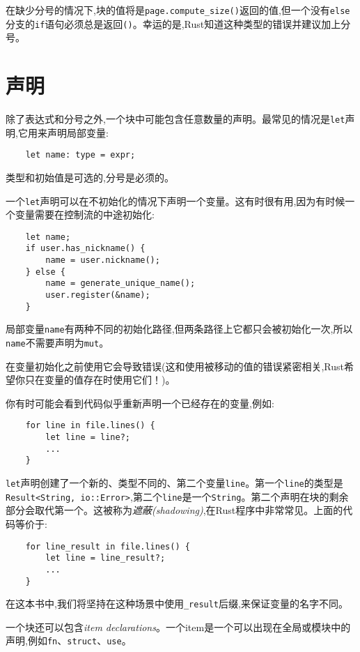 在缺少分号的情况下,块的值将是\texttt{page.compute\_size()}返回的值,但一个没有\texttt{else}分支的\texttt{if}语句必须总是返回\texttt{()}。幸运的是,Rust知道这种类型的错误并建议加上分号。

\section{声明}\label{declaration}

除了表达式和分号之外,一个块中可能包含任意数量的声明。最常见的情况是\texttt{let}声明,它用来声明局部变量:
\begin{verbatim}
    let name: type = expr;
\end{verbatim}

类型和初始值是可选的,分号是必须的。

一个\texttt{let}声明可以在不初始化的情况下声明一个变量。这有时很有用,因为有时候一个变量需要在控制流的中途初始化:
\begin{verbatim}
    let name;
    if user.has_nickname() {
        name = user.nickname();
    } else {
        name = generate_unique_name();
        user.register(&name);
    }
\end{verbatim}

局部变量\texttt{name}有两种不同的初始化路径,但两条路径上它都只会被初始化一次,所以\texttt{name}不需要声明为\texttt{mut}。

在变量初始化之前使用它会导致错误(这和使用被移动的值的错误紧密相关,Rust希望你只在变量的值存在时使用它们！)。

你有时可能会看到代码似乎重新声明一个已经存在的变量,例如:
\begin{verbatim}
    for line in file.lines() {
        let line = line?;
        ...
    }
\end{verbatim}

\texttt{let}声明创建了一个新的、类型不同的、第二个变量\texttt{line}。第一个\texttt{line}的类型是\texttt{Result<String, io::Error>},第二个\texttt{line}是一个\texttt{String}。第二个声明在块的剩余部分会取代第一个。这被称为\emph{遮蔽(shadowing)},在Rust程序中非常常见。上面的代码等价于:
\begin{verbatim}
    for line_result in file.lines() {
        let line = line_result?;
        ...
    }
\end{verbatim}

在这本书中,我们将坚持在这种场景中使用\texttt{\_result}后缀,来保证变量的名字不同。

一个块还可以包含\emph{item declarations}。一个item是一个可以出现在全局或模块中的声明,例如\texttt{fn}、\texttt{struct}、\texttt{use}。

